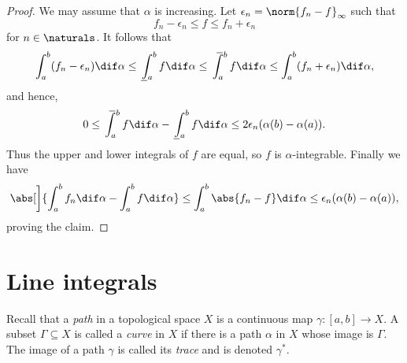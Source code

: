 \documentclass[article, a4paper, 11pt, oneside]{memoir}
\numberwithin{equation}{chapter}
\begin{document}
\begin{proof}
    We may assume that $\alpha$ is increasing. Let $\epsilon_n = \norm{f_n - f}_\infty$ such that
    \begin{equation*}
        f_n - \epsilon_n
            \leq f
            \leq f_n + \epsilon_n
    \end{equation*}
    for $n \in \naturals$. It follows that
    \begin{equation*}
        \int_a^b (f_n - \epsilon_n) \dif\alpha
            \leq \lowint_a^b f \dif\alpha
            \leq \upint_a^b f \dif\alpha
            \leq \int_a^b (f_n + \epsilon_n) \dif\alpha,
    \end{equation*}
    and hence,
    \begin{equation*}
        0
            \leq \upint_a^b f \dif\alpha - \lowint_a^b f \dif\alpha
            \leq 2 \epsilon_n (\alpha(b) - \alpha(a)).
    \end{equation*}
    Thus the upper and lower integrals of $f$ are equal, so $f$ is $\alpha$-integrable. Finally we have
    \begin{equation*}
        \abs[\bigg]{ \int_a^b f_n \dif\alpha - \int_a^b f \dif\alpha }
            \leq \int_a^b \abs{f_n - f} \dif\alpha
            \leq \epsilon_n (\alpha(b) - \alpha(a)),
    \end{equation*}
    proving the claim.
\end{proof}


\section{Line integrals}

\newcommand{\partition}{\mathcal{P}}
\newcommand{\grad}{\nabla}

\noindent Recall that a \emph{path} in a topological space $X$ is a continuous map $\gamma \colon [a,b] \to X$. A subset $\Gamma \subseteq X$ is called a \emph{curve} in $X$ if there is a path $\alpha$ in $X$ whose image is $\Gamma$. The image of a path $\gamma$ is called its \emph{trace} and is denoted $\gamma^*$.
\end{document}
